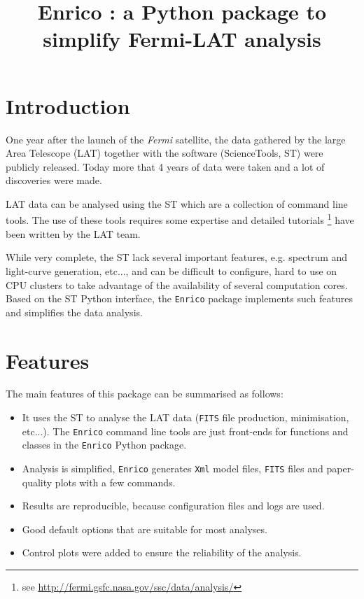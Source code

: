 \documentclass[a4paper]{article}
\title{Enrico : a Python package to simplify Fermi-LAT analysis}
\newcommand{\Fermi}{\textit{Fermi} }
\begin{document}
\maketitle
\section{Introduction}

One year after the launch of the \Fermi satellite, the data gathered by the
large Area Telescope (LAT) together with the software (ScienceTools, ST) were
publicly released. Today more that 4 years of data were taken and a lot of
discoveries were made.

LAT data can be analysed using the ST which are a collection of command line
tools. The use of these tools requires some expertise and detailed tutorials
\footnote{see \url{http://fermi.gsfc.nasa.gov/ssc/data/analysis/}} have been
written by the LAT team.

While very complete, the ST lack several important features, e.g. spectrum and
light-curve generation, etc..., and can be difficult to configure, hard to use on
CPU clusters to take advantage of the availability of several computation
cores. Based on the ST Python interface, the {\tt Enrico} package implements
such features and simplifies the data analysis.

\section{Features}




The main features of this package can be summarised as follows:

\begin{itemize}
\item It uses the ST to analyse the LAT data ({\tt FITS} file production,
minimisation, etc...). The {\tt Enrico} command line tools are just front-ends
for functions and classes in the {\tt Enrico} Python package.
\item Analysis is simplified, {\tt Enrico} generates {\tt Xml} model files, {\tt FITS} files and paper-quality plots with a few commands.
\item Results are reproducible, because configuration files and logs are used.
\item Good default options that are suitable for most analyses.
\item Control plots were added to ensure the reliability of the analysis.
\end{itemize}
\end{document}
